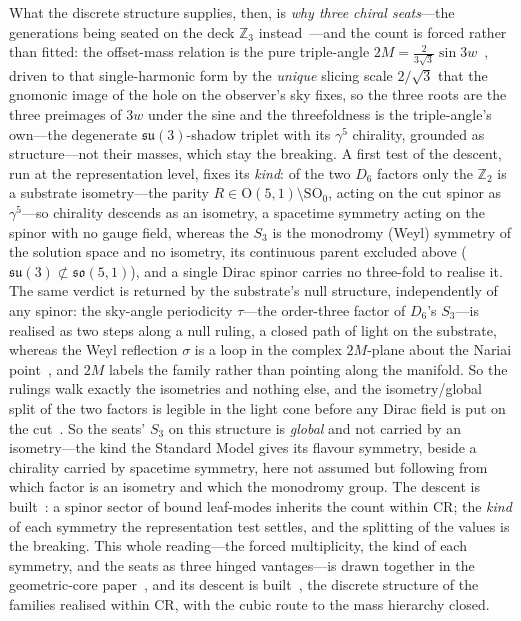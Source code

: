 \documentclass[11pt]{article}
\theoremstyle{plain}
\theoremstyle{remark}
\begin{document}
What the discrete structure supplies, then, is \emph{why three chiral seats}---the generations being seated on the deck $\mathbb{Z}_3$ instead~\cite{JanzenMatter}---and the count is forced rather than fitted: the offset-mass relation is the pure triple-angle $2M=\tfrac{2}{3\sqrt3}\sin 3w$~\cite{JanzenSlicing}, driven to that single-harmonic form by the \emph{unique} slicing scale $2/\sqrt3$ that the gnomonic image of the hole on the observer's sky fixes, so the three roots are the three preimages of $3w$ under the sine and the threefoldness is the triple-angle's own---the degenerate $\mathfrak{su}(3)$-shadow triplet with its $\gamma^5$ chirality, grounded as structure---not their masses, which stay the breaking. A first test of the descent, run at the representation level, fixes its \emph{kind}: of the two $D_6$ factors only the $\mathbb{Z}_2$ is a substrate isometry---the parity $R\in\mathrm{O}(5,1)\setminus\mathrm{SO}_0$, acting on the cut spinor as $\gamma^5$---so chirality descends as an isometry, a spacetime symmetry acting on the spinor with no gauge field, whereas the $S_3$ is the monodromy (Weyl) symmetry of the solution space and no isometry, its continuous parent excluded above ($\mathfrak{su}(3)\not\subset\mathfrak{so}(5,1)$), and a single Dirac spinor carries no three-fold to realise it. The same verdict is returned by the substrate's null structure, independently of any spinor: the sky-angle periodicity $\tau$---the order-three factor of $D_6$'s $S_3$---is realised as two steps along a null ruling, a closed path of light on the substrate, whereas the Weyl reflection $\sigma$ is a loop in the complex $2M$-plane about the Nariai point~\cite{JanzenGroupoid}, and $2M$ labels the family rather than pointing along the manifold. So the rulings walk exactly the isometries and nothing else, and the isometry/global split of the two factors is legible in the light cone before any Dirac field is put on the cut~\cite{JanzenSlicing,JanzenGeometricCore}. So the seats' $S_3$ on this structure is \emph{global} and not carried by an isometry---the kind the Standard Model gives its flavour symmetry, beside a chirality carried by spacetime symmetry, here not assumed but following from which factor is an isometry and which the monodromy group. The descent is built~\cite{JanzenMatter}: a spinor sector of bound leaf-modes inherits the count within CR; the \emph{kind} of each symmetry the representation test settles, and the splitting of the values is the breaking. This whole reading---the forced multiplicity, the kind of each symmetry, and the seats as three hinged vantages---is drawn together in the geometric-core paper~\cite{JanzenGeometricCore}, and its descent is built~\cite{JanzenMatter}, the discrete structure of the families realised within CR, with the cubic route to the mass hierarchy closed.
\end{document}
